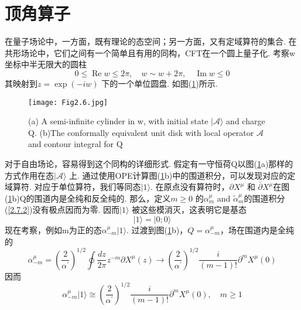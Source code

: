 \section{顶角算子}%

在量子场论中，一方面，既有理论的态空间；另一方面，又有定域算符的集合. 在共形场论中，它们之间有一个简单且有用的同构，CFT在一个圆上量子化. 考察w坐标中半无限大的圆柱
\begin{equation}
0 \leq \operatorname{Re} w \leq 2 \pi, \quad w \sim w+2 \pi, \quad \operatorname{Im} w \leq 0
\end{equation}
其映射到$z=\exp (-i w)$ 下的一个单位圆盘.  如图(\ref{Fig2.6})所示.
\begin{figure}
\begin{center}
\texttt{[image: Fig2.6.jpg]}\\
\caption{(a) A semi-infinite cylinder in w, with initial state $|\mathscr{A}\rangle$ and charge Q. 
(b)The conformally equivalent unit disk with local operator $\mathscr{A}$ and contour integral for Q}\label{Fig2.6}
\end{center}
\end{figure}
对于自由场论，容易得到这个同构的详细形式. 假定有一守恒荷Q以图(\ref{Fig2.6}a)那样的方式作用在态$|\mathscr{A}\rangle$ 上. 通过使用OPE计算图(\ref{Fig2.6}b)中的围道积分，可以发现对应的定域算符. 对应于单位算符，我们等同态$|1\rangle$. 在原点没有算符时，$\partial X^{\mu}$ 和 $\bar{\partial} X^{\mu}$在图(\ref{Fig2.6}b)Q的围道内是全纯和反全纯的. 那么，定义$m \geq 0$ 的$\alpha_{m}^{\mu}$ and $\tilde{\alpha}_{m}^{\mu}$的围道积分(\ref{2.7.2})没有极点因而为零. 因而$|1\rangle$ 被这些模消灭，这表明它是基态
\begin{equation}
|1\rangle=|0 ; 0\rangle
\end{equation}
现在考察，例如m为正的态$\alpha_{-m}^{\mu}|1\rangle$. 过渡到图(\ref{Fig2.6}b)，$Q=\alpha_{-m}^{\mu}$，场在围道内是全纯的
\begin{equation}\label{2.8.3}
\alpha_{-m}^{\mu}=\left(\frac{2}{\alpha^{\prime}}\right)^{1 / 2} \oint \frac{d z}{2 \pi} z^{-m} \partial X^{\mu}(z) \rightarrow\left(\frac{2}{\alpha^{\prime}}\right)^{1 / 2} \frac{i}{(m-1) !} \partial^{m} X^{\mu}(0)
\end{equation}
因而
\begin{equation}
\alpha_{-m}^{\mu}|1\rangle \cong\left(\frac{2}{\alpha^{\prime}}\right)^{1 / 2} \frac{i}{(m-1) !} \partial^{m} X^{\mu}(0), \quad m \geq 1
\end{equation}
